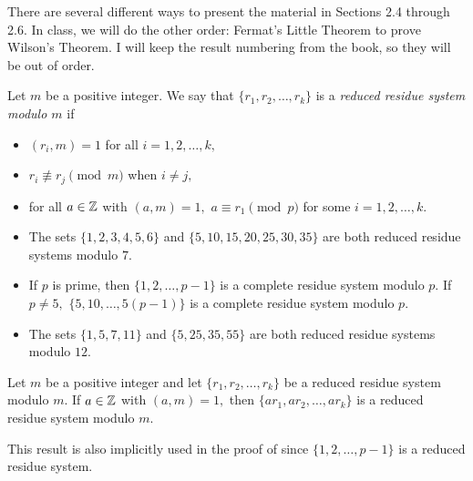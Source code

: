 \documentclass{../ximera}
\begin{document}
There are several different ways to present the material in Sections 2.4 through 2.6. In class, we will do the other order: Fermat's Little Theorem to prove Wilson's Theorem. I will keep the result numbering from the book, so they will be out of order.


\begin{defn}\label{defn:reduced-res-sys}
    Let $m$ be a positive integer. We say that $\{r_1,r_2,\dots,r_k\}$ is a \emph{reduced residue system modulo $m$} if 
    \begin{itemize}
        \item $(r_i,m)=1$ for all $i=1,2,\dots,k,$
        \item $r_i\not \equiv r_j \pmod {m}$ when $i\neq j,$
        \item for all $a\in\mathbb Z$ with $(a,m)=1,$ $a\equiv r_1\pmod{p}$ for some $i=1,2,\dots,k.$ 
    \end{itemize}
\end{defn}

\begin{example}\label{example:reduced-sys}
    
    \begin{itemize}
        \item The sets $\{1,2,3,4,5,6\}$ and $\{5,10,15,20,25,30,35\}$ are both reduced residue systems modulo $7.$
        
        \item If $p$ is prime, then $\{1,2,\dots,p-1\}$ is a complete residue system modulo $p.$ If $p\neq 5,$ $\{5,10,\dots, 5(p-1)\}$ is a complete residue system modulo $p.$
        
        \item The sets $\{1,5,7,11\}$ and $\{5,25,35,55\}$ are both reduced residue systems modulo $12.$
    \end{itemize}
\end{example}


\begin{lem*}[Porism 2.18]\label{lem:reduced-sys}
    Let $m$ be a positive integer and let $\{r_1,r_2,\dots,r_k\}$ be a reduced residue system modulo $m.$ If $a\in\mathbb Z$ with $(a,m)=1,$ then $\{ar_1,ar_2,\dots,ar_k\}$ is a reduced residue system modulo $m.$
\end{lem*}
This result is also implicitly used in the proof of  since $\{1,2,\dots,p-1\}$ is a reduced residue system.
\end{document}
